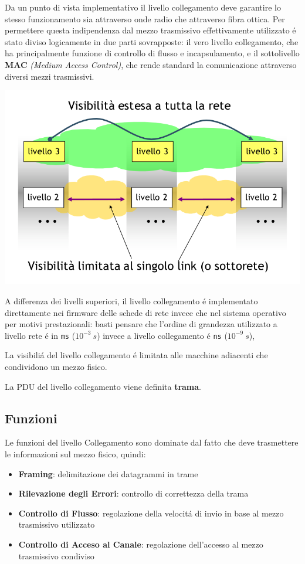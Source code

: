 \documentclass[12pt]{article}
\def\code#1{\texttt{#1}}
\begin{document}
Da un punto di vista implementativo il livello collegamento deve garantire lo stesso funzionamento sia attraverso onde radio 
che attraverso fibra ottica. Per permettere questa indipendenza dal mezzo trasmissivo effettivamente utilizzato \'e stato 
diviso logicamente in due parti sovrapposte: il vero livello collegamento, che ha principalmente funzione di controllo di 
flusso e incapsulamento, e il sottolivello \textbf{MAC} \textit{(Medium Access Control)}, che rende standard la 
comunicazione attraverso diversi mezzi trasmissivi.
\begin{center}
	\includegraphics[scale=0.45]{livello_collegamento-img1.png}
\end{center}
A differenza dei livelli superiori, il livello collegamento \'e implementato direttamente nei firmware delle schede di rete  
invece che nel sistema operativo per motivi prestazionali: basti pensare che l'ordine di grandezza utilizzato a livello rete 
\'e in \code{ms} ($10^{-3}\ s$) invece a livello collegamento \'e \code{ns} ($10^{-9}\ s$), 

La visibili\'a del livello collegamento \'e limitata alle macchine adiacenti che condividono un mezzo fisico.

La PDU del livello collegamento viene definita \textbf{trama}.

\clearpage
\subsection{Funzioni}\label{livello-collegamento-funzioni}
Le funzioni del livello Collegamento sono dominate dal fatto che deve trasmettere le informazioni sul mezzo fisico, quindi:
\begin{itemize}
	\item \textbf{Framing}: delimitazione dei datagrammi in trame
	\item \textbf{Rilevazione degli Errori}: controllo di correttezza della trama
	\item \textbf{Controllo di Flusso}: regolazione della velocit\'a di invio in base al mezzo trasmissivo utilizzato
	\item \textbf{Controllo di Acceso al Canale}: regolazione dell'accesso al mezzo trasmissivo condiviso
\end{itemize}
\end{document}
